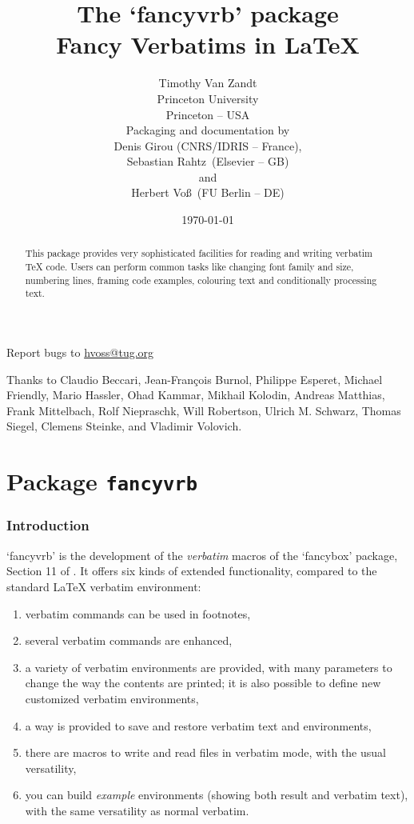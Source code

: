 \documentclass[twoside]{article}
\title{The `\textsf{fancyvrb}' package\\Fancy Verbatims in \LaTeX}
\author{Timothy Van Zandt\\Princeton University\\Princeton -- USA\\[5mm]
        {Packaging and documentation by}\\
        {\footnotesize Denis Girou (CNRS/IDRIS -- France),}\\[-2mm]
        {\footnotesize Sebastian Rahtz\dagger\ (Elsevier -- GB)}\\[-2mm]
        {\footnotesize and}\\[-2mm]
        {\footnotesize Herbert Voß\ (FU Berlin -- DE)}
        }
\date{\today}
\newcommand\FBoxPackage{`\textsf{fancybox}'}
\newcommand\FVrbPackage{`\textsf{fancyvrb}'}
\begin{document}
\maketitle
%
\begin{abstract}
    This package provides very sophisticated facilities for reading and
  writing verbatim \TeX{} code. Users can perform common tasks like changing
  font family and size, numbering lines, framing code examples, colouring
  text and conditionally processing text.
\end{abstract}

\begin{center}
Report bugs to \url{hvoss@tug.org}
\end{center}

\vfill
Thanks to 
Claudio Beccari,
Jean-François Burnol, 
Philippe Esperet, %
Michael Friendly, %
Mario Hassler, %
Ohad Kammar, %
Mikhail Kolodin, %
Andreas Matthias,
Frank Mittelbach,
Rolf Niepraschk, %
Will Robertson,
Ulrich M. Schwarz, 
Thomas Siegel, %
Clemens Steinke,
and 
Vladimir Volovich. %
\clearpage
\tableofcontents
\clearpage


\part{Package \texttt{fancyvrb}}


\section{Introduction}
%
  \FVrbPackage{} is the development of the \emph{verbatim} macros of the
\FBoxPackage{} package,  Section 11 of \cite{FancyBox}. It offers six kinds
of extended functionality, compared to the standard \LaTeX{}
\textsf{verbatim} environment:

\begin{enumerate}
  \item verbatim commands can be used in footnotes,
  \item several verbatim commands are enhanced,
  \item a variety of verbatim environments are provided, with many
  parameters to change the way the contents are printed; it is also possible
  to define new customized verbatim environments,
  \item a way is provided to save and restore verbatim text and environments,
  \item there are macros to write and read files in verbatim mode, with the
  usual versatility,
  \item you can build \emph{example} environments (showing both result and
  verbatim text), with the same versatility as normal verbatim.
\end{enumerate}
\end{document}
